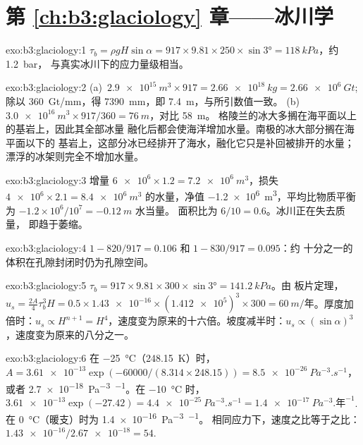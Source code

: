 \section*{第 \ref{ch:b3:glaciology} 章——冰川学}

\begin{solution}{exo:b3:glaciology:1}
$\tau_b = \rho gH\sin\alpha = 917\times9.81\times250\times\sin\ang{3} =
\qty{118}{kPa}$，约 \qty{1.2}{bar}，
与真实冰川下的应力量级相当。
\end{solution}

\begin{solution}{exo:b3:glaciology:2}
(a)~$\qty{2.9e15}{m^3}\times917 = \qty{2.66e18}{kg} = \qty{2.66e6}{Gt}$;
除以 \qty{360}{Gt/mm}，得 \qty{7390}{mm}，即 \qty{7.4}{m}，与所引数值一致。
(b)~$\qty{3.0e16}{m^3}\times917/360 = \qty{76}{m}$，对比 \qty{58}{m}。
格陵兰的冰大多搁在海平面以上的基岩上，因此其全部冰量
融化后都会使海洋增加水量。南极的冰大部分搁在海平面以下的
基岩上，这部分冰已经排开了海水，融化它只是补回被排开的水量；
漂浮的冰架则完全不增加水量。
\end{solution}

\begin{solution}{exo:b3:glaciology:3}
增量 $\num{6e6}\times1.2 = \qty{7.2e6}{m^3}$，损失 $\num{4e6}\times2.1 =
\qty{8.4e6}{m^3}$ 的水量，净值 \qty{-1.2e6}{m^3}，平均比物质平衡
为 $-1.2\times10^6/10^7 = \qty{-0.12}{m}$ 水当量。
面积比为 $6/10 = 0.6$。冰川正在失去质量，
即趋于萎缩。
\end{solution}

\begin{solution}{exo:b3:glaciology:4}
$1 - 820/917 = \num{0.106}$ 和 $1 - 830/917 = \num{0.095}$：约
十分之一的体积在孔隙封闭时仍为孔隙空间。
\end{solution}

\begin{solution}{exo:b3:glaciology:5}
$\tau_b = 917\times9.81\times300\times\sin\ang{3} = \qty{141.2}{kPa}$。由
板片定理，$u_s = \tfrac{2A}{4}\tau_b^3H = 0.5\times\num{1.43e-16}
\times(\num{1.412e5})^3\times300 = \qty{60}{m/\text{年}}$。厚度加倍时：$u_s
\propto H^{n+1} = H^4$，速度变为原来的十六倍。坡度减半时：$u_s \propto
(\sin\alpha)^3$，速度变为原来的八分之一。
\end{solution}

\begin{solution}{exo:b3:glaciology:6}
在 \qty{-25}{\celsius}（\qty{248.15}{K}）时，$A = \num{3.61e-13}\exp(-60000/
(8.314\times248.15)) = \qty{8.5e-26}{Pa^{-3}.s^{-1}}$，或者
\qty{2.7e-18}{Pa^{-3}.^{-1}}。在 \qty{-10}{\celsius} 时，$\num{3.61e-13}
\exp(-27.42) = \qty{4.4e-25}{Pa^{-3}.s^{-1}} = \qty{1.4e-17}{Pa^{-3}.\text{年}^{-1}}$.
在 \qty{0}{\celsius}（暖支）时为 \qty{1.4e-16}{Pa^{-3}.^{-1}}。
相同应力下，速度之比等于之比：
$\num{1.43e-16}/\num{2.67e-18} = 54$.
\end{solution}

